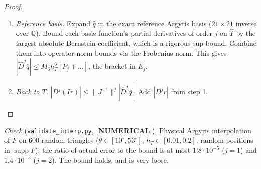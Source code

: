 \documentclass[11pt]{article}
\theoremstyle{remark}\newtheorem{remark}[theorem]{Remark}
\newcommand{\norm}[1]{\|#1\|}\newcommand{\ip}[2]{\langle #1,#2\rangle}\DeclareMathOperator{\curl}{curl}\DeclareMathOperator{\diam}{diam}
\newcommand{\lab}[1]{\textbf{[#1]}}
\begin{document}
\begin{proof}
\begin{enumerate}[label=\arabic*.]
\begin{itemize}
\item $|\gamma_{E_0}|\le M_6h_T^6(\tfrac2{120}+2c_H)$;
\item $|\gamma_{E_{1,2}}|\le M_6h_T^6(\tfrac{2^{-5}}{120}+\tfrac{\sqrt2}{\sin\theta}\tfrac{c_H}2)$, since the data at $a_0$ vanish.
\end{itemize}
The vertex DOFs at $a_1,a_2$ are $D^mr[E_{i_1},\dots,E_{i_m}]$, of size $\le M_6h_T^6/(6-m)!$.
\item \emph{Reference basis.} Expand $\hat q$ in the exact reference Argyris basis ($21\times21$ inverse over $\mathbb Q$).
Bound each basis function's partial derivatives of order $j$ on $\hat T$ by the largest absolute Bernstein coefficient, which
is a rigorous sup bound. Combine them into operator-norm bounds via the Frobenius norm. This gives
$|\hat D^j\hat q|\le M_6h_T^6[P_j+\dots]$, the bracket in $E_j$.
\item \emph{Back to $T$.} $|D^j(Ir)|\le\norm{J^{-1}}^j|\hat D^j\hat q|$. Add $|D^jr|$ from step 1.\qedhere
\end{enumerate}
\end{proof}
\emph{Check} (\texttt{validate\_interp.py}, \lab{NUMERICAL}). Physical Argyris interpolation of $F$ on 600 random triangles
($\theta\in[10^\circ,53^\circ]$, $h_T\in[0.01,0.2]$, random positions in $\operatorname{supp}F$): the ratio of actual error to
the bound is at most $1.8\cdot10^{-5}$ ($j=1$) and $1.4\cdot10^{-5}$ ($j=2$). The bound holds, and is very loose.
\end{document}
